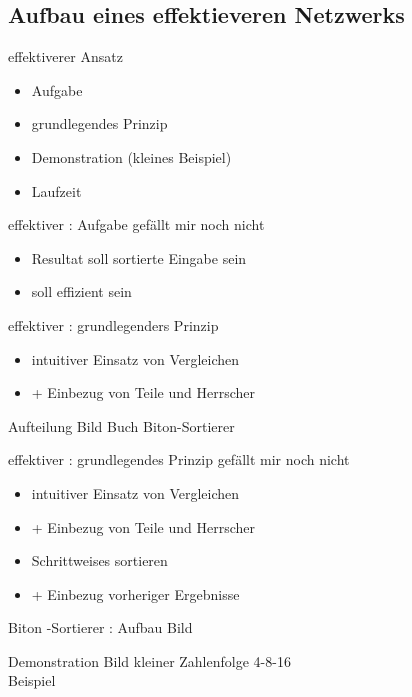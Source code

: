 \documentclass[ucs,9pt]{beamer}
\begin{document}
\subsection*{Aufbau eines effektieveren Netzwerks}
\begin{frame}{effektiverer Ansatz}
\begin{itemize}
\item Aufgabe
\item grundlegendes Prinzip
\item Demonstration (kleines Beispiel)
\item Laufzeit
\end{itemize}
\end{frame}
\begin{frame}{effektiver : Aufgabe}
{\color{red}gefällt mir noch nicht}
\begin{itemize}
\item Resultat soll sortierte Eingabe sein
\item \alert{soll effizient sein}
\end{itemize}
\end{frame}
\begin{frame}{effektiver : grundlegenders Prinzip}
\begin{itemize}
\item intuitiver Einsatz von Vergleichen
\item[]\alert{+ Einbezug von Teile und Herrscher}
\end{itemize}
\end{frame}
\begin{frame}{Aufteilung}
Bild Buch Biton-Sortierer
\end{frame}
\begin{frame}{effektiver : grundlegendes Prinzip}
{\color{red}gefällt mir noch nicht}
\begin{itemize}
\item intuitiver Einsatz von Vergleichen
\item[]\alert{+ Einbezug von Teile und Herrscher}
\item Schrittweises sortieren 
\item[]\alert{+ Einbezug vorheriger Ergebnisse}
\end{itemize}
\end{frame}
\begin{frame}{Biton -Sortierer : Aufbau}
Bild
\end{frame}
\begin{frame}{Demonstration}
Bild kleiner Zahlenfolge 4-8-16\\
Beispiel
\end{frame}
\end{document}
